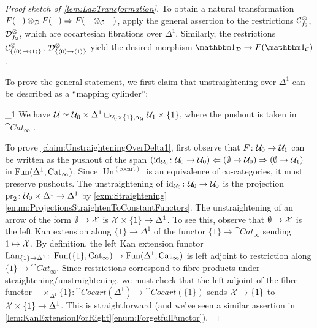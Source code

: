 \begin{proof}[Proof sketch of \cref{lem:LaxTransformation}]
	To obtain a natural transformation $F(-)\otimes_{\mathcal{D}} F(-)\Rightarrow F(-\otimes_{\mathcal{C}}-)$, apply the general assertion to the restrictions $\mathcal{C}^\otimes_{f_2}$, $\mathcal{D}^\otimes_{f_2}$, which are cocartesian fibrations over $\Delta^1$. Similarly, the restrictions $\mathcal{C}^\otimes_{\{\langle 0\rangle \rightarrow \langle 1\rangle\}}$, $\mathcal{D}^\otimes_{\{\langle 0\rangle \rightarrow \langle 1\rangle\}}$ yield the desired morphism $\IUnit_\Dd\rightarrow F(\IUnit_\Cc)$.
	
	To prove the general statement, we first claim that unstraightening over $\Delta^1$ can be described as a \enquote{mapping cylinder}:
	\begin{alphanumerate}\itshape
		\item[\boxtimes_1] We have $\mathcal{U}\simeq \mathcal{U}_0\times\Delta^1\sqcup_{\mathcal{U}_0\times\{1\},\alpha_{\mathcal{U}}}\mathcal{U}_1\times\{1\}$, where the pushout is taken in $\cat{Cat}_\infty$ .\label{claim:UnstraighteningOverDelta1} 
	\end{alphanumerate}
	To prove \cref{claim:UnstraighteningOverDelta1}, first observe that $F\colon \mathcal{U}_0\rightarrow \mathcal{U}_1$ can be written as the pushout of the span $(\operatorname{id}_{\mathcal{U}_0}\colon \mathcal{U}_0\rightarrow \mathcal{U}_0)\Leftarrow (\emptyset \rightarrow \mathcal{U}_0) \Rightarrow (\emptyset \rightarrow \mathcal{U}_1)$ in $\operatorname{Fun}(\Delta^1,\mathrm{Cat}_\infty)$. Since $\operatorname{Un}^{(\mathrm{cocart})}$ is an equivalence of $\infty$-categories, it must preserve pushouts. The unstraightening of $\operatorname{id}_{\mathcal{U}_0}\colon \mathcal{U}_0\rightarrow \mathcal{U}_0$ is the projection $\operatorname{pr}_2\colon \mathcal{U}_0\times\Delta^1\rightarrow \Delta^1$ by \cref{exm:Straightening}\cref{enum:ProjectionsStraightenToConstantFunctors}. The unstraightening of an arrow of the form $\emptyset \rightarrow \mathcal{X}$ is $\mathcal{X}\times\{1\}\rightarrow \Delta^1$. To see this, observe that $\emptyset\rightarrow \mathcal{X}$ is the left Kan extension along $\{1\}\rightarrow \Delta^1$ of the functor $\{1\}\rightarrow \cat{Cat}_\infty$ sending $1\mapsto \mathcal{X}$. By definition, the left Kan extension functor $\operatorname{Lan}_{\{1\}\rightarrow \Delta^1}\colon \operatorname{Fun}(\{1\},\mathrm{Cat}_\infty)\rightarrow \operatorname{Fun}(\Delta^1,\mathrm{Cat}_\infty)$ is left adjoint to restriction along $\{1\}\rightarrow \cat{Cat}_\infty$. Since restrictions correspond to fibre products under straightening/unstraightening, we must check that the left adjoint of the fibre functor $-\times_{\Delta^1}\{1\}\colon \cat{Cocart}(\Delta^1)\rightarrow \cat{Cocart}(\{1\})$ sends $\mathcal{X}\rightarrow \{1\}$ to $\mathcal{X}\times\{1\}\rightarrow \Delta^1$. This is straightforward (and we've seen a similar assertion in \cref{lem:KanExtensionForRight}\cref{enum:ForgetfulFunctor}).
	

\end{proof}
